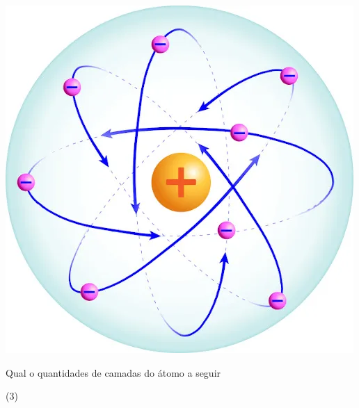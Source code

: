 \documentclass[11pt]{article}
\begin{document}
\begin{exercise}
\begin{choice}
\choice \includegraphics[scale=.2]{Adaptadas/ruther.png}
\end{choice}
\end{exercise}


\begin{exercise}
Qual o quantidades de camadas do átomo a seguir
\begin{center}
\end{center}
\begin{choice}(3)
\end{choice}
\end{exercise}







\end{document}
